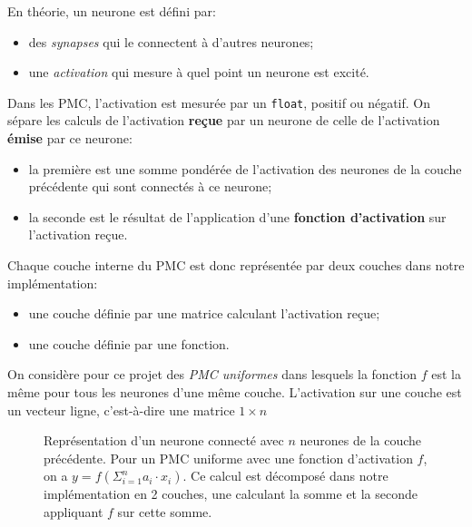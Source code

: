 \documentclass[a4paper]{article}
\begin{document}
En théorie, un neurone est défini par:
\begin{itemize}
\item des \emph{synapses} qui le connectent à d'autres neurones;
\item une \emph{activation} qui mesure à quel point un neurone est \og excité\fg{}.
\end{itemize}
Dans les PMC, l'activation est mesurée par un \texttt{float}, positif
ou négatif. On sépare les calculs de l'activation \textbf{reçue} par
un neurone de celle de l'activation \textbf{émise} par ce neurone:
\begin{itemize}
\item la première est une somme pondérée de l'activation des neurones
  de la couche précédente qui sont connectés à ce neurone;
\item la seconde est le résultat de l'application d'une
  \textbf{fonction d'activation} sur l'activation reçue.
\end{itemize}
Chaque couche interne du PMC est donc représentée par deux couches
dans notre implémentation:
\begin{itemize}
\item une couche définie par une matrice calculant l'activation reçue;
\item une couche définie par une fonction.
\end{itemize}
On considère pour ce projet des \emph{PMC uniformes} dans lesquels la
fonction \(f\) est la même pour tous les neurones d'une même
couche. L'activation sur une couche est un vecteur ligne, c'est-à-dire
une matrice \(1\times n\)

\begin{figure}[htbp]
  \centering
{}
\caption{Représentation d'un neurone connecté avec \(n\) neurones de
  la couche précédente. Pour un PMC uniforme avec une fonction
  d'activation \(f\), on a \(y= f ( \Sigma_{i=1}^n a_i\cdot x_i)\). Ce
  calcul est décomposé dans notre implémentation en 2 couches, une
  calculant la somme et la seconde appliquant \(f\) sur cette somme.}
  \label{fig:neurone}
\end{figure}
\end{document}
